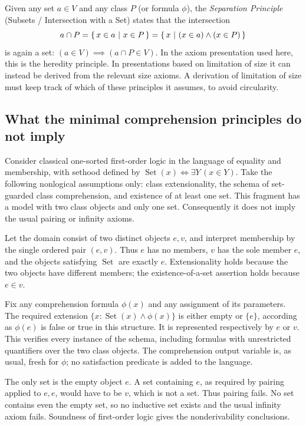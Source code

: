 Given any set $a \in V$ and any class $P$ (or formula $\phi$), the \emph{Separation Principle} (Subsets / Intersection with a Set) states that the intersection
\[
a \cap P = \left\{\,x \in a\ \middle|\ x \in P\,\right\} = \left\{\,x\ \middle|\ (x \in a) \land (x \in P)\,\right\}
\]
is again a set: $(a \in V) \implies (a \cap P \in V)$. In the axiom presentation used here, this is the heredity principle.
In presentations based on limitation of size it can instead be derived
from the relevant size axioms. A derivation of limitation of size must keep
track of which of these principles it assumes, to avoid circularity.

\subsection{What the minimal comprehension principles do not imply}
\begin{theorem}
\label{thm:minimal_class_countermodel}
Consider classical one-sorted first-order logic in the language of equality
and membership, with sethood defined by
$\operatorname{Set}(x)\iff\exists Y\,(x\in Y)$. Take the following
nonlogical assumptions only: class extensionality, the schema of
set-guarded class comprehension, and existence of at least one set.
This fragment has a model with two class objects and only one set.
Consequently it does not imply the usual pairing or infinity axioms.
\end{theorem}
\Proof
Let the domain consist of two distinct objects $e,v$, and interpret
membership by the single ordered pair $(e,v)$. Thus $e$ has no members,
$v$ has the sole member $e$, and the objects satisfying $\operatorname{Set}$
are exactly $e$. Extensionality holds because the two objects have
different members; the existence-of-a-set assertion holds because
$e\in v$.

Fix any comprehension formula $\phi(x)$ and any assignment of its
parameters. The required extension
$\{x:\operatorname{Set}(x)\land\phi(x)\}$ is either empty or $\{e\}$,
according as $\phi(e)$ is false or true in this structure. It is
represented respectively by $e$ or $v$. This verifies every instance
of the schema, including formulas with unrestricted quantifiers over
the two class objects. The comprehension output variable is, as usual,
fresh for $\phi$; no satisfaction predicate is added to the language.

The only set is the empty object $e$. A set containing $e$, as required
by pairing applied to $e,e$, would have to be $v$, which is not a set.
Thus pairing fails. No set contains even the empty set, so no inductive
set exists and the usual infinity axiom fails. Soundness of first-order
logic gives the nonderivability conclusions.
\Done

